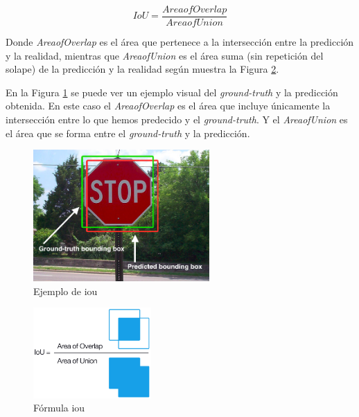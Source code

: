 \begin{equation}\label{iou}
IoU = \frac{AreaofOverlap}{AreaofUnion}
\end{equation}

Donde \textit{AreaofOverlap} es el área que pertenece a la intersección entre la predicción y la realidad, mientras que \textit{AreaofUnion} es el área suma (sin repetición del solape) de la predicción y la realidad según muestra la Figura \ref{fig.formula_iou}.

En la Figura \ref{fig.ejemplo_iou} se puede ver un ejemplo visual del \textit{ground-truth} y la predicción obtenida. En este caso el \textit{AreaofOverlap} es el área que incluye únicamente la intersección entre lo que hemos predecido y el \textit{ground-truth}. Y el \textit{AreaofUnion} es el área que se forma entre el \textit{ground-truth} y la predicción.

\begin{figure}[H]
  \begin{center}
    \includegraphics[width=0.6\textwidth]{figures/Herramientas/iou.png}
		\caption{Ejemplo de \acrshort{iou}}
		\label{fig.ejemplo_iou}
		\end{center}
\end{figure}


\begin{figure}[H]
  \begin{center}
    \includegraphics[width=0.4\textwidth]{figures/Herramientas/iou_formula.png}
		\caption{Fórmula \acrshort{iou}}
		\label{fig.formula_iou}
		\end{center}
\end{figure}

